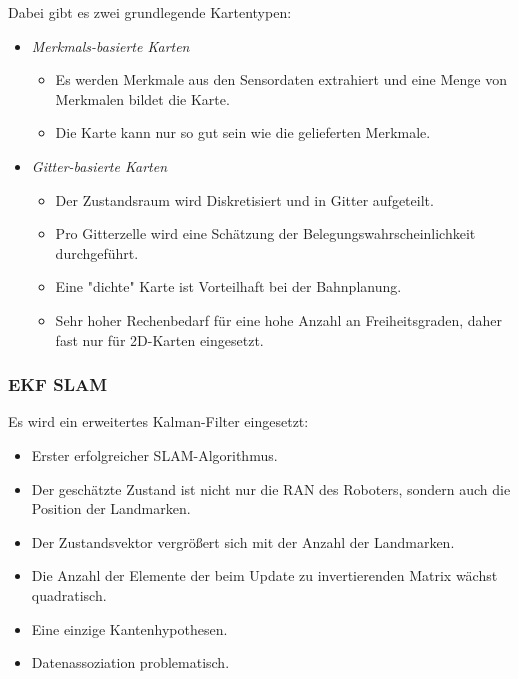 			Dabei gibt es zwei grundlegende Kartentypen:
			\begin{itemize}
				\item \emph{Merkmals-basierte Karten}
					\begin{itemize}
						\item Es werden Merkmale aus den Sensordaten extrahiert und eine Menge von Merkmalen bildet die Karte.
						\item Die Karte kann nur so gut sein wie die gelieferten Merkmale.
					\end{itemize}
				\item \emph{Gitter-basierte Karten}
					\begin{itemize}
						\item Der Zustandsraum wird Diskretisiert und in Gitter aufgeteilt.
						\item Pro Gitterzelle wird eine Schätzung der Belegungswahrscheinlichkeit durchgeführt.
						\item Eine "dichte" Karte ist Vorteilhaft bei der Bahnplanung.
						\item Sehr hoher Rechenbedarf für eine hohe Anzahl an Freiheitsgraden, daher fast nur für 2D-Karten eingesetzt.
					\end{itemize}
			\end{itemize}

			\subsubsection{EKF SLAM}
				Es wird ein erweitertes Kalman-Filter eingesetzt:
				\begin{itemize}
					\item Erster erfolgreicher SLAM-Algorithmus.
					\item Der geschätzte Zustand ist nicht nur die RAN des Roboters, sondern auch die Position der Landmarken.
					\item Der Zustandsvektor vergrößert sich mit der Anzahl der Landmarken.
					\item Die Anzahl der Elemente der beim Update zu invertierenden Matrix wächst quadratisch.
					\item Eine einzige Kantenhypothesen.
					\item Datenassoziation problematisch.
				\end{itemize}
			
